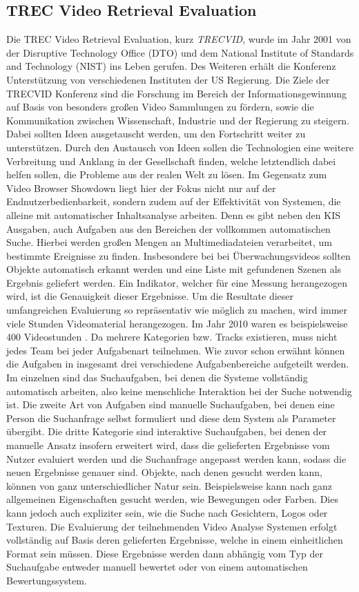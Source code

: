 \documentclass[11pt,a4paper]{report}
\begin{document}
\subsection{TREC Video Retrieval Evaluation}

Die TREC Video Retrieval Evaluation, kurz \emph{TRECVID}, wurde im Jahr 2001 von der Disruptive Technology Office (DTO) und dem National Institute of Standards and Technology (NIST) ins Leben gerufen. Des Weiteren erhält die Konferenz Unterstützung von verschiedenen Instituten der US Regierung. Die Ziele der TRECVID Konferenz sind die Forschung im Bereich der Informationsgewinnung auf Basis von besonders großen Video Sammlungen zu fördern, sowie die Kommunikation zwischen Wissenschaft, Industrie und der Regierung zu steigern. Dabei sollten Ideen ausgetauscht werden, um den Fortschritt weiter zu unterstützen. Durch den Austausch von Ideen sollen die Technologien eine weitere Verbreitung und Anklang in der Gesellschaft finden, welche letztendlich dabei helfen sollen, die Probleme aus der realen Welt zu lösen. Im Gegensatz zum Video Browser Showdown liegt hier der Fokus nicht nur auf der Endnutzerbedienbarkeit, sondern zudem auf der Effektivität von Systemen, die alleine mit automatischer Inhaltsanalyse arbeiten. Denn es gibt neben den KIS Ausgaben, auch Aufgaben aus den Bereichen der vollkommen automatischen Suche. Hierbei werden großen Mengen an Multimediadateien verarbeitet, um bestimmte Ereignisse zu finden. Insbesondere bei bei Überwachungsvideos sollten Objekte automatisch erkannt werden und eine Liste mit gefundenen Szenen als Ergebnis geliefert werden. Ein Indikator, welcher für eine Messung herangezogen wird, ist die Genauigkeit dieser Ergebnisse. Um die Resultate dieser umfangreichen Evaluierung so repräsentativ wie möglich zu machen, wird immer viele Stunden Videomaterial herangezogen. Im Jahr 2010 waren es beispielsweise 400 Videostunden \cite{over2005trecvid} \cite{over2011trecvid}. Da mehrere Kategorien bzw. Tracks existieren, muss nicht jedes Team bei jeder Aufgabenart teilnehmen. Wie zuvor schon erwähnt können die Aufgaben in insgesamt drei verschiedene Aufgabenbereiche aufgeteilt werden. Im einzelnen sind das Suchaufgaben, bei denen die Systeme vollständig automatisch arbeiten, also keine menschliche Interaktion bei der Suche notwendig ist. Die zweite Art von Aufgaben sind manuelle Suchaufgaben, bei denen eine Person die Suchanfrage selbst formuliert und diese dem System als Parameter übergibt. Die dritte Kategorie sind interaktive Suchaufgaben, bei denen der manuelle Ansatz insofern erweitert wird, dass die gelieferten Ergebnisse vom Nutzer evaluiert werden und die Suchanfrage angepasst werden kann, sodass die neuen Ergebnisse genauer sind. Objekte, nach denen gesucht werden kann, können von ganz unterschiedlicher Natur sein. Beispielsweise kann nach ganz allgemeinen Eigenschaften gesucht werden, wie Bewegungen oder Farben. Dies kann jedoch auch expliziter sein, wie die Suche nach Gesichtern, Logos oder Texturen. Die Evaluierung der teilnehmenden Video Analyse Systemen erfolgt vollständig auf Basis deren gelieferten Ergebnisse, welche in einem einheitlichen Format sein müssen. Diese Ergebnisse werden dann abhängig vom Typ der Suchaufgabe entweder manuell bewertet oder von einem automatischen Bewertungssystem. \cite{niaz2014eurecom}
\end{document}
